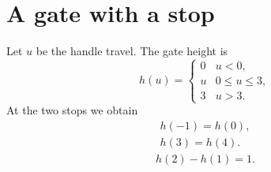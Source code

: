 \documentclass{article}
\begin{document}
\section*{A gate with a stop}

Let $u$ be the handle travel. The gate height is
\[
 h(u)=\begin{cases}0&u<0,\\u&0\le u\le 3,\\3&u>3.\end{cases}
\]
At the two stops we obtain
\begin{gather}h(-1)=h(0),\\h(3)=h(4).\end{gather}
\begin{gather*}h(2)-h(1)=1.\end{gather*}
\end{document}
